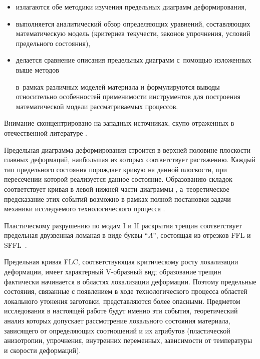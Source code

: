 \begin{itemize}

\item[а)] излагаются обе методики изучения предельных диаграмм деформирования, 

\item[б)] выполняется аналитический обзор определяющих уравнений, составляющих математическую модель (критериев текучести, законов упрочнения, условий предельного состояния), 

\item[в)] делается сравнение описания предельных диаграмм с~помощью изложенных выше методов

в~рамках различных моделей материала и формулируются выводы относительно особенностей применимости инструментов для построения математической модели рассматриваемых процессов.

\end{itemize}

 Внимание сконцентрировано на западных источниках, скупо отраженных \linebreak в отечественной литературе \cite{keller:bib:bogatov, keller:bib:smirnov, keller:bib:kalpin}.



Предельная диаграмма деформирования строится в верхней половине \linebreak плоскости главных деформаций, наибольшая из которых соответствует растяжению. Каждый тип предельного состояния порождает кривую на данной плоскости, при пересечении которой реализуется данное состояние. Образованию складок соответствует кривая в левой нижней части диаграммы \cite{keller:bib:marcbook}, а~теоретическое предсказание этих событий возможно в рамках полной постановки задачи механики исследуемого технологического процесса \cite{keller:bib:kim}. 

Пластическому разрушению по модам I и II раскрытия трещин соответствует предельная двузвенная ломаная в виде буквы "`$\Lambda$"', состоящая из отрезков FFL и SFFL~\cite{keller:bib:martins2015}. 

Предельная кривая FLC, соответствующая критическому росту локализации деформации, имеет характерный V-образный вид; образование трещин фактически начинается в областях локализации деформации. Поэтому предельные состояния, связанные с появлением в ходе технологического процесса областей локального утонения заготовки, представляются более опасными. Предметом исследования в настоящей работе будут именно эти события, теоретический анализ которых допускает рассмотрение локального состояния материала, зависящего от определяющих соотношений и их атрибутов (пластической анизотропии, упрочнения, внутренних переменных, зависимости от температуры и скорости деформаций). 



